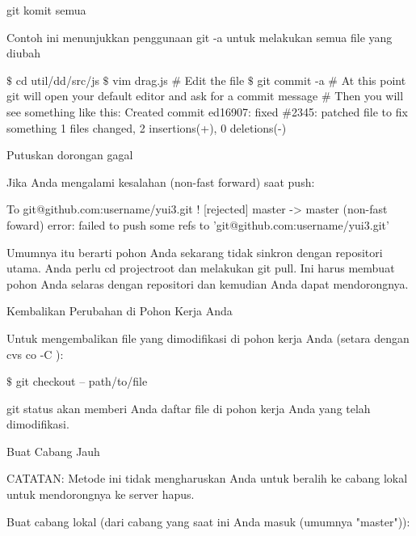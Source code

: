 \vspace{12pt}
\noindent 
 $  $git komit semua \par
\vspace{12pt}
\noindent 
Contoh ini menunjukkan penggunaan $  $git -a $  $untuk melakukan semua file yang diubah \par
\noindent 
  $  \$  $ cd util/dd/src/js  $  \$  $ vim drag.js  $  \#  $ Edit the file  $  \$  $ git commit -a  $  \#  $ At this point git will open your default editor and ask for a commit message  $  \#  $ Then you will see something like this: Created commit ed16907: fixed  $  \#  $2345: patched file to fix something 1 files changed, 2 insertions(+), 0 deletions(-)  \par
\noindent 
 $  $Putuskan dorongan gagal \par
\vspace{12pt}
\noindent 
Jika Anda mengalami kesalahan (non-fast forward) saat push: \par
\noindent 
 To git@github.com:username/yui3.git ! [rejected] master -> master (non-fast foward) error: failed to push some refs to 'git@github.com:username/yui3.git'  \par
\vspace{12pt}
\noindent 
Umumnya itu berarti pohon Anda sekarang tidak sinkron dengan repositori utama. $  $Anda perlu cd projectroot dan melakukan git pull. $  $Ini harus membuat pohon Anda selaras dengan repositori dan kemudian Anda dapat mendorongnya. \par
\vspace{12pt}
\noindent 
 $  $Kembalikan Perubahan di Pohon Kerja Anda \par
\vspace{12pt}
\noindent 
Untuk mengembalikan file yang dimodifikasi di pohon kerja Anda (setara dengan $  $cvs co -C $  $): \par
\noindent 
  $  \$  $ git checkout -- path/to/file  \par
\noindent 
git status $  $akan memberi Anda daftar file di pohon kerja Anda yang telah dimodifikasi. \par
\vspace{12pt}
\noindent 
 $  $Buat Cabang Jauh \par
\vspace{12pt}
\noindent 
CATATAN: Metode ini tidak mengharuskan Anda untuk beralih ke cabang lokal untuk mendorongnya ke server hapus. \par
\vspace{12pt}
\noindent 
Buat cabang lokal (dari cabang yang saat ini Anda masuk (umumnya "master")): \par
